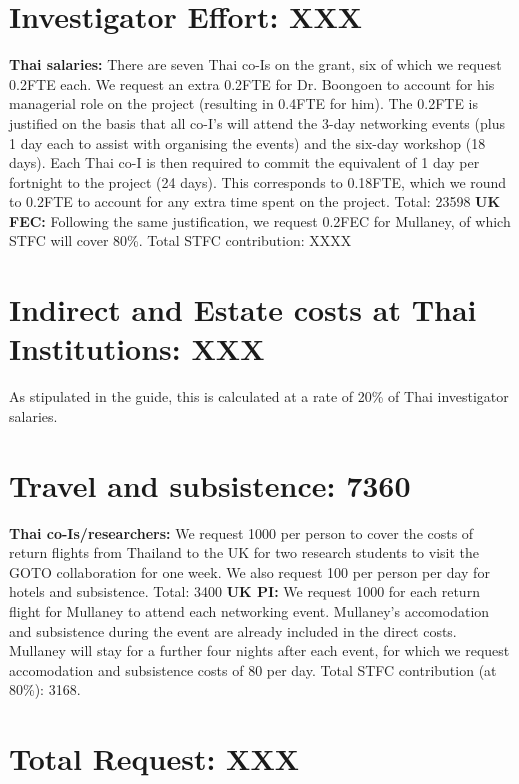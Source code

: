 \documentclass[11pt]{article}
\begin{document}
\vspace{-3mm}
\section{Investigator Effort: XXX}
\vspace{-3mm}
{\bf Thai salaries:} There are seven Thai co-Is on the grant, six of which we request 0.2FTE each. We request an extra 0.2FTE for Dr. Boongoen to account for his managerial role on the project (resulting in 0.4FTE for him). The 0.2FTE is justified on the basis that all co-I's will attend the 3-day networking events (plus 1 day each to assist with organising the events) and the six-day workshop (18 days). Each Thai co-I is then required to commit the equivalent of 1 day per fortnight to the project (24 days). This corresponds to 0.18FTE, which we round to 0.2FTE to account for any extra time spent on the project. Total: 23598 {\bf UK FEC:} Following the same justification, we request 0.2FEC for Mullaney, of which STFC will cover 80\%. Total STFC contribution: XXXX

\vspace{-3mm}
\section{Indirect and Estate costs at Thai Institutions: XXX}
\vspace{-3mm}
As stipulated in the guide, this is calculated at a rate of 20\% of Thai investigator salaries.

\vspace{-3mm}
\section{Travel and subsistence: 7360}
\vspace{-3mm}
{\bf Thai co-Is/researchers:} We request 1000 per person to cover the costs of return flights from Thailand to the UK for two research students to visit the GOTO collaboration for one week. We also request 100 per person per day for hotels and subsistence. Total: 3400 {\bf UK PI:} We request 1000 for each return flight for Mullaney to attend each networking event. Mullaney's accomodation and subsistence during the event are already included in the direct costs. Mullaney will stay for a further four nights after each event, for which we request accomodation and subsistence costs of 80 per day. Total STFC contribution (at 80\%): 3168.

\vspace{-3mm}
\section{Total Request: XXX}
\end{document}

